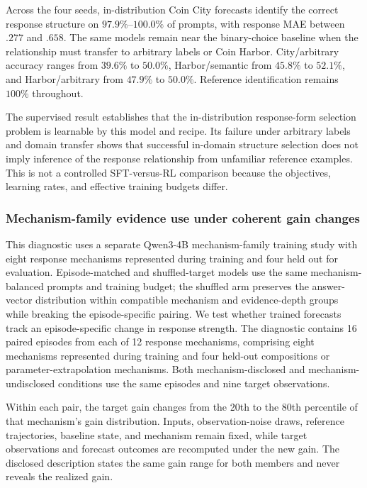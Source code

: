 Across the four seeds, in-distribution Coin City forecasts identify the correct response structure on \(97.9\%\)--\(100.0\%\) of prompts, with response MAE between $.277$ and $.658$.
The same models remain near the binary-choice baseline when the relationship must transfer to arbitrary labels or Coin Harbor.
City/arbitrary accuracy ranges from \(39.6\%\) to \(50.0\%\), Harbor/semantic from \(45.8\%\) to \(52.1\%\), and Harbor/arbitrary from \(47.9\%\) to \(50.0\%\).
Reference identification remains \(100\%\) throughout.

The supervised result establishes that the in-distribution response-form selection problem is learnable by this model and recipe.
Its failure under arbitrary labels and domain transfer shows that successful in-domain structure selection does not imply inference of the response relationship from unfamiliar reference examples.
This is not a controlled SFT-versus-RL comparison because the objectives, learning rates, and effective training budgets differ.

\subsubsection{Mechanism-family evidence use under coherent gain changes}
\label{app:exp3-evidence-use}

This diagnostic uses a separate Qwen3-4B mechanism-family training study with eight response mechanisms represented during training and four held out for evaluation.
Episode-matched and shuffled-target models use the same mechanism-balanced prompts and training budget; the shuffled arm preserves the answer-vector distribution within compatible mechanism and evidence-depth groups while breaking the episode-specific pairing.
We test whether trained forecasts track an episode-specific change in response strength.
The diagnostic contains 16 paired episodes from each of 12 response mechanisms, comprising eight mechanisms represented during training and four held-out compositions or parameter-extrapolation mechanisms.
Both mechanism-disclosed and mechanism-undisclosed conditions use the same episodes and nine target observations.

Within each pair, the target gain changes from the 20th to the 80th percentile of that mechanism's gain distribution.
Inputs, observation-noise draws, reference trajectories, baseline state, and mechanism remain fixed, while target observations and forecast outcomes are recomputed under the new gain.
The disclosed description states the same gain range for both members and never reveals the realized gain.

